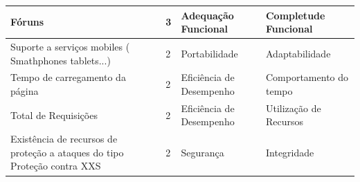 \begin{apendicesenv}
\begin{longtable}{|p{175pt}|p{18pt}|p{110pt}|p{120pt}|}
 

{\raggedright Fóruns}
  	 	 & {\raggedright {3}}
  	 	 & {\raggedright {Adequação Funcional}}
  	 	 & {\raggedright {Completude Funcional}}\\
  	 	\hline  	 	
{\raggedright {Suporte a serviços mobiles ( Smathphones tablets...)}}
  	 	 & {\raggedright {2}}
  	 	 & {\raggedright {Portabilidade}}
  	 	 & {\raggedright {Adaptabilidade}}\\
  	 	\hline
 {\raggedright {Tempo de carregamento da página}}
  	 	 & {\raggedright {2}}
  	 	 & {\raggedright {Eficiência de Desempenho}}
  	 	 & {\raggedright {Comportamento do tempo}}\\
  	 	\hline
 {\raggedright {Total de Requisições}}
  	 	 & {\raggedright {2}}
  	 	 & {\raggedright {Eficiência de Desempenho}}
  	 	 & {\raggedright {Utilização de Recursos}}\\
  	 	\hline
{\raggedright {Existência de recursos de proteção a ataques do tipo Proteção contra XXS}}
  	 	 & {\raggedright {2}}
  	 	 & {\raggedright {Segurança}}
  	 	 & {\raggedright {Integridade}}\\
  	 	\hline
 

\end{longtable}
\end{apendicesenv}
